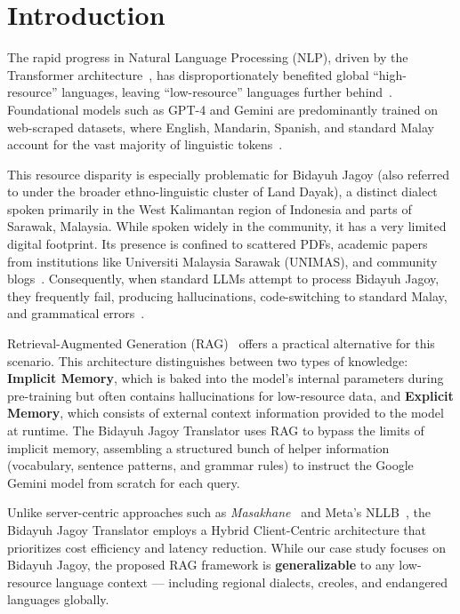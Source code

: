 \documentclass[12pt]{article}
\begin{document}
\section{Introduction}

The rapid progress in Natural Language Processing (NLP), driven by the Transformer architecture~\cite{vaswani2017attention}, has disproportionately benefited global ``high-resource'' languages, leaving ``low-resource'' languages further behind~\cite{nekoto2020participatory}. Foundational models such as GPT-4 and Gemini are predominantly trained on web-scraped datasets, where English, Mandarin, Spanish, and standard Malay account for the vast majority of linguistic tokens~\cite{nllb2022no}.

This resource disparity is especially problematic for Bidayuh Jagoy (also referred to under the broader ethno-linguistic cluster of Land Dayak), a distinct dialect spoken primarily in the West Kalimantan region of Indonesia and parts of Sarawak, Malaysia. While spoken widely in the community, it has a very limited digital footprint. Its presence is confined to scattered PDFs, academic papers from institutions like Universiti Malaysia Sarawak (UNIMAS), and community blogs~\cite{unimas_repo}. Consequently, when standard LLMs attempt to process Bidayuh Jagoy, they frequently fail, producing hallucinations, code-switching to standard Malay, and grammatical errors~\cite{scispace_intensifiers}.

Retrieval-Augmented Generation (RAG)~\cite{intersystems_rag} offers a practical alternative for this scenario. This architecture distinguishes between two types of knowledge: \textbf{Implicit Memory}, which is baked into the model's internal parameters during pre-training but often contains hallucinations for low-resource data, and \textbf{Explicit Memory}, which consists of external context information provided to the model at runtime. The Bidayuh Jagoy Translator uses RAG to bypass the limits of implicit memory, assembling a structured bunch of helper information (vocabulary, sentence patterns, and grammar rules) to instruct the Google Gemini model from scratch for each query.

Unlike server-centric approaches such as \textit{Masakhane}~\cite{nekoto2020participatory} and Meta's NLLB~\cite{nllb2022no}, the Bidayuh Jagoy Translator employs a Hybrid Client-Centric architecture that prioritizes cost efficiency and latency reduction. While our case study focuses on Bidayuh Jagoy, the proposed RAG framework is \textbf{generalizable} to any low-resource language context --- including regional dialects, creoles, and endangered languages globally.
\end{document}
